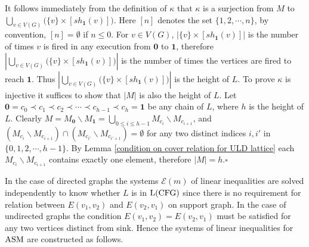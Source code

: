 \documentclass{article}
\theoremstyle{definition}
\newcommand\shotvector[2]{sh_{#1}(#2)}
\newcommand\set[1]{\{ #1 \}}
\begin{document}
It follows immediately from the definition of $\kappa$ that $\kappa$ is a surjection from $M$ to $\underset{v \in V(G)}{\bigcup} \big(\set{v}\times [\shotvector{\textbf{1}}{v}]\big)$. Here $[n]$ denotes the set $\set{1,2,\cdots,n}$, by convention, $[n]=\emptyset$ if $n \leq 0$. For $v\in V(G)$, $|\set{v}\times [\shotvector{\textbf{1}}{v}]|$ is the number of times $v$ is fired in any execution from $\textbf{0}$ to $\textbf{1}$, therefore $|\underset{v \in V(G)}{\bigcup} \big(\set{v}\times [\shotvector{\textbf{1}}{v}]\big)|$ is the number of times the vertices are fired to reach $\textbf{1}$. Thus $|\underset{v \in V(G)}{\bigcup} \big(\set{v}\times [\shotvector{\textbf{1}}{v}]\big)|$ is the height of $L$. To prove $\kappa$ is injective it suffices to show that $|M|$ is also the height of $L$. Let $\textbf{0}=c_0\prec c_1\prec c_2\prec \cdots\prec c_{h-1}\prec c_h=\textbf{1}$  be any chain of $L$, where $h$ is the height of $L$. Clearly $M=M_{\textbf{0}}\backslash M_{\textbf{1}}=\underset{0 \leq i \leq h-1}{\bigcup} M_{c_i}\backslash M_{c_{i+1}}$, and $(M_{c_i}\backslash M_{c_{i+1}})\cap (M_{c_{i'}}\backslash M_{c_{i'+1}})=\emptyset$ for any two distinct indices $i,i'$ in $\set{0,1,2,\cdots,h-1}$. By Lemma \ref{condition on cover relation for ULD lattice} each $M_{c_i}\backslash M_{c_{i+1}}$ contains exactly one element, therefore $|M|=h$.\hfill $\square$

In the case of directed graphs the systems $\mathcal{E}(m)$ of linear inequalities are solved independently to know whether $L$ is in ${\rm L(CFG)}$ since there is no requirement for relation between $E(v_1,v_2)$ and $E(v_2,v_1)$ on support graph. In the case of undirected graphs the condition $E(v_1,v_2)=E(v_2,v_1)$ must be satisfied for any two vertices distinct from sink. Hence the systems of linear inequalities for ${\rm ASM}$ are constructed as follows.
\end{document}
